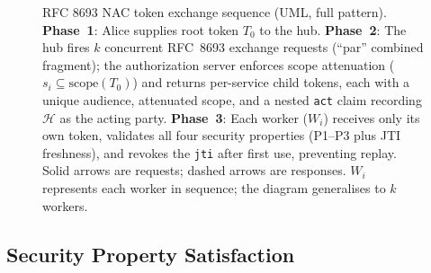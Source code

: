 \documentclass[journal]{IEEEtran}
\begin{document}
\begin{figure}[!ht]
\caption{RFC 8693 NAC token exchange sequence (UML, full pattern).
\textbf{Phase~1}: Alice supplies root token $T_0$ to the hub.
\textbf{Phase~2}: The hub fires $k$ concurrent RFC~8693 exchange requests
(``par'' combined fragment); the authorization server enforces scope
attenuation ($s_i \subseteq \mathrm{scope}(T_0)$) and returns per-service
child tokens, each with a unique audience, attenuated scope, and a nested
\texttt{act} claim recording $\mathcal{H}$ as the acting party.
\textbf{Phase~3}: Each worker ($W_i$) receives only its own token,
validates all four security properties (P1--P3 plus JTI freshness), and
revokes the \texttt{jti} after first use, preventing replay.
Solid arrows are requests; dashed arrows are responses.
$W_i$ represents each worker in sequence; the diagram generalises to
$k$ workers.}
\label{fig:nac_seq}
\end{figure}

\subsection{Security Property Satisfaction}
\end{document}
